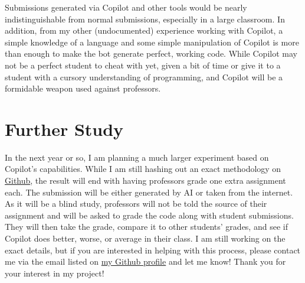 \documentclass[12pt]{article}
\begin{document}
Submissions generated via Copilot and other tools would be nearly
indistinguishable from normal submissions, especially in a large
classroom. In addition, from my other (undocumented) experience working
with Copilot, a simple knowledge of a language and some simple
manipulation of Copilot is more than enough to make the bot generate
perfect, working code. While Copilot may not be a perfect student to
cheat with yet, given a bit of time or give it to a student with a
cursory understanding of programming, and Copilot will be a formidable
weapon used against professors.

\hypertarget{further-study}{%
\section{Further Study}\label{further-study}}

In the next year or so, I am planning a much larger experiment based on
Copilot's capabilities. While I am still hashing out an exact
methodology on
\href{https://github.com/2br-2b/Github-Copilot-Project/blob/master/Methodology.md}{Github},
the result will end with having professors grade one extra assignment
each. The submission will be either generated by AI or taken from the
internet. As it will be a blind study, professors will not be told the
source of their assignment and will be asked to grade the code along
with student submissions. They will then take the grade, compare it to
other students' grades, and see if Copilot does better, worse, or
average in their class. I am still working on the exact details, but if
you are interested in helping with this process, please contact me via
the email listed on \href{https://github.com/2br-2b}{my Github profile}
and let me know! Thank you for your interest in my project!
\end{document}
